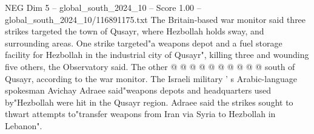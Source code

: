 \begin{textsample}{NEG Dim 5 – global\_south\_2024\_10 – Score 1.00 – global\_south\_2024\_10/116891175.txt}
The Britain-based war monitor said three strikes targeted the town of Qusayr, where Hezbollah holds sway, and surrounding areas.
One strike targeted"a weapons depot and a fuel storage facility for Hezbollah in the industrial city of Qusayr", killing three and wounding five others, the Observatory said.
The other @ @ @ @ @ @ @ @ @ @ south of Qusayr, according to the war monitor.
The Israeli military ' s Arabic-language spokesman Avichay Adraee said"weapons depots and headquarters used by"Hezbollah were hit in the Qusayr region.
Adraee said the strikes sought to thwart attempts to"transfer weapons from Iran via Syria to Hezbollah in Lebanon".

\end{textsample}
